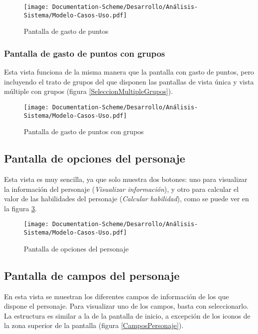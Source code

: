 \begin{figure}[H]
    \centering
    \texttt{[image: Documentation-Scheme/Desarrollo/Análisis-Sistema/Modelo-Casos-Uso.pdf]}
    \caption{Pantalla de gasto de puntos}
    \label{GastoPuntos}    
\end{figure}

\subsubsection{Pantalla de gasto de puntos con grupos}
Esta vista funciona de la misma manera que la pantalla con gasto de puntos, pero incluyendo el trato de grupos del 
que disponen las pantallas de vista única y vista múltiple con grupos (figura \ref*{SeleccionMultipleGrupos}).

\begin{figure}[H]
    \centering
    \texttt{[image: Documentation-Scheme/Desarrollo/Análisis-Sistema/Modelo-Casos-Uso.pdf]}
    \caption{Pantalla de gasto de puntos con grupos}
    \label{GastoPuntosGrupos}    
\end{figure}

\subsection{Pantalla de opciones del personaje}
Esta vista es muy sencilla, ya que solo muestra dos botones: uno para visualizar la información del personaje 
(\textit{Visualizar información}), y otro para calcular el valor de las habilidades del personaje (\textit{Calcular habilidad}), 
como se puede ver en la figura \ref*{OpcionesPersonaje}.

\begin{figure}[H]
    \centering
    \texttt{[image: Documentation-Scheme/Desarrollo/Análisis-Sistema/Modelo-Casos-Uso.pdf]}
    \caption{Pantalla de opciones del personaje}
    \label{OpcionesPersonaje}    
\end{figure}

\subsection{Pantalla de campos del personaje}
En esta vista se muestran los diferentes campos de información de los que dispone el personaje.
Para visualizar uno de los campos, basta con seleccionarlo. La estructura es similar a la de la 
pantalla de inicio, a excepción de los iconos de la zona superior de la pantalla (figura \ref*{CamposPersonaje}).

